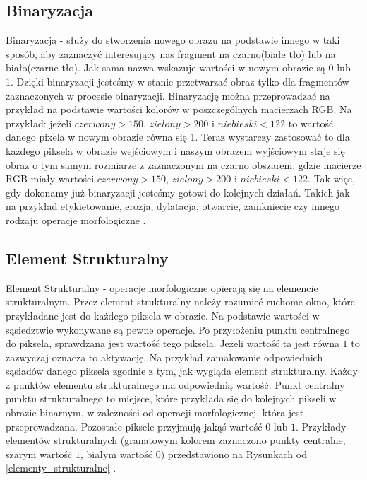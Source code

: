 \documentclass{article}
\begin{document}
        \subsection{Binaryzacja}
        {
            \label{sec:binaryzacja}
            \Large
            \justifying
            \quad
            Binaryzacja - służy do stworzenia nowego obrazu na podstawie innego w taki sposób, aby zaznaczyć interesujący nas fragment na czarno(białe tło)
            lub na biało(czarne tło). Jak sama nazwa wskazuje wartości w nowym obrazie są 0 lub 1. Dzięki binaryzacji jesteśmy w stanie przetwarzać obraz
            tylko dla fragmentów zaznaczonych w procesie binaryzacji. Binaryzację można przeprowadzać na przykład na podstawie wartości kolorów w poszczególnych
            macierzach RGB. Na przykład: 
            jeżeli \(czerwony > 150\), \(zielony > 200\) i \(niebieski < 122\) to wartość danego pixela w nowym obrazie równa się 1.
            Teraz wystarczy zastosować to dla każdego piksela w obrazie wejściowym i naszym obrazem wyjściowym staje się obraz o tym samym rozmiarze
            z zaznaczonym na czarno obszarem, gdzie macierze RGB miały wartości \(czerwony > 150\), \(zielony > 200\) i \(niebieski < 122\).
            Tak więc, gdy dokonamy już binaryzacji jesteśmy gotowi do kolejnych działań.
            Takich jak na przykład etykietowanie, erozja, dylatacja, otwarcie, zamkniecie czy innego rodzaju operacje morfologiczne \cite{Digital Image Processing Second Edition}.
        }
        \subsection{Element Strukturalny}
        {
            \label{sec:element-strukturalny}
            \Large
            \justifying
            \quad
            Element Strukturalny - operacje morfologiczne opierają się na elemencie strukturalnym.
            Przez element strukturalny należy rozumieć ruchome okno, które przykładane jest do każdego piksela w obrazie.
            Na podstawie wartości w sąsiedztwie wykonywane są pewne operacje.
            Po przyłożeniu punktu centralnego do piksela, sprawdzana jest wartość tego piksela.
            Jeżeli wartość ta jest równa \(1\) to zazwyczaj oznacza to aktywację.
            Na przykład zamalowanie odpowiednich sąsiadów danego piksela zgodnie z tym, jak wygląda element strukturalny.
            Każdy z punktów elementu strukturalnego ma odpowiednią wartość.
            Punkt centralny punktu strukturalnego to miejsce, które przykłada się do kolejnych pikseli w obrazie binarnym, w zależności od operacji morfologicznej, która jest przeprowadzana.
            Pozostałe piksele przyjmują jakąś wartość \(0\) lub \(1\).
            Przykłady elementów strukturalnych (granatowym kolorem zaznaczono punkty centralne, szarym wartość \(1\), białym wartość \(0\)) przedstawiono na Rysunkach od \ref{elementy_strukturalne} \cite{Digital Image Processing Second Edition}.
        }
\end{document}
